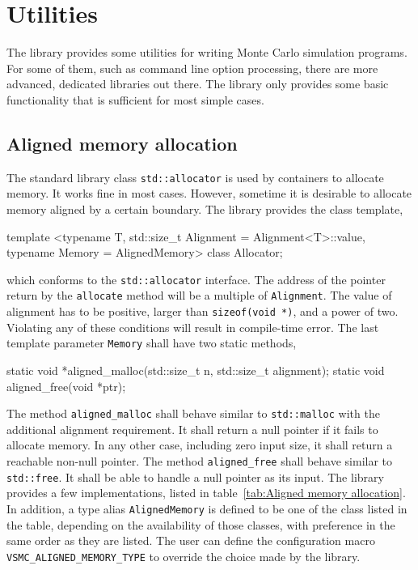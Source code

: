 \chapter{Utilities}
\label{chap:Utilities}

The library provides some utilities for writing Monte Carlo simulation
programs. For some of them, such as command line option processing, there are
more advanced, dedicated libraries out there. The library only provides some
basic functionality that is sufficient for most simple cases.

\section{Aligned memory allocation}
\label{sec:Aligned memory allocation}

The standard library class \verb|std::allocator| is used by containers to
allocate memory. It works fine in most cases. However, sometime it is desirable
to allocate memory aligned by a certain boundary. The library provides the
class template,
\begin{cppcode}
  template <typename T, std::size_t Alignment = Alignment<T>::value,
      typename Memory = AlignedMemory>
  class Allocator;
\end{cppcode}
which conforms to the \verb|std::allocator| interface. The address of the
pointer return by the \verb|allocate| method will be a multiple of
\verb|Alignment|. The value of alignment has to be positive, larger than
\verb|sizeof(void *)|, and a power of two. Violating any of these conditions
will result in compile-time error. The last template parameter \verb|Memory|
shall have two static methods,
\begin{cppcode}
  static void *aligned_malloc(std::size_t n, std::size_t alignment);
  static void aligned_free(void *ptr);
\end{cppcode}
The method \verb|aligned_malloc| shall behave similar to \verb|std::malloc|
with the additional alignment requirement. It shall return a null pointer if it
fails to allocate memory. In any other case, including zero input size, it
shall return a reachable non-null pointer. The method \verb|aligned_free| shall
behave similar to \verb|std::free|. It shall be able to handle a null pointer
as its input. The library provides a few implementations, listed in
table~\ref{tab:Aligned memory allocation}. In addition, a type alias
\verb|AlignedMemory| is defined to be one of the class listed in the table,
depending on the availability of those classes, with preference in the same
order as they are listed. The user can define the configuration macro
\verb|VSMC_ALIGNED_MEMORY_TYPE| to override the choice made by the library.

